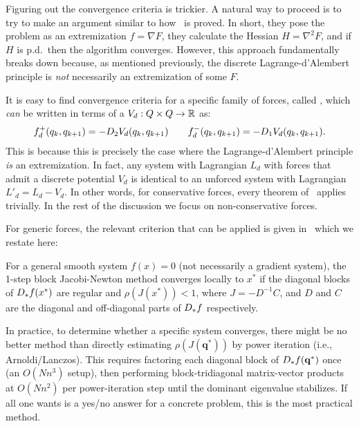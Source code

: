 Figuring out the convergence criteria is trickier. A natural way to proceed is to try to make an argument similar to how~\cite[Prop. 4.5]{ferraroParallelIterativeMethod2025} is proved. In short, they pose the problem as an extremization $f = \nabla F$, they calculate the Hessian $H = \nabla^2 F$, and if $H$ is p.d.\ then the algorithm converges. However, this approach fundamentally breaks down because, as mentioned previously, the discrete Lagrange-d'Alembert principle is \emph{not} necessarily an extremization of some $F$.

\begin{remark}
	It is easy to find convergence criteria for a specific family of forces, called , which \emph{can} be written in terms of a  $V_d : Q \times Q \to {\mathbb{R}}$ as:
	\[
		f_d^+(q_k, q_{k+1}) = -D_{2} V_d (q_k, q_{k+1})
		\qquad
		f_d^-(q_k, q_{k+1}) = -D_{1} V_d(q_k, q_{k+1}).
	\]
	This is because this is precisely the case where the Lagrange-d'Alembert principle \emph{is} an extremization. In fact, any system with Lagrangian $L_d$ with forces that admit a discrete potential $V_d$ is identical to an unforced system with Lagrangian $L'_d = L_d - V_d$. In other words, for conservative forces, every theorem of~\cite{ferraroParallelIterativeMethod2025} applies trivially. In the rest of the discussion we focus on non-conservative forces.
\end{remark}

For generic forces, the relevant criterion that can be applied is given in~\cite[Lem.~4.4]{ferraroParallelIterativeMethod2025} which we restate here:

\begin{lemma}\label{lem:jacobi-newton-convergence}
	For a general smooth system $f(x) = 0$ (not necessarily a gradient system), the 1-step block Jacobi-Newton method converges locally to $x^*$ if the diagonal blocks of $D_{*} f(x^*)$ are regular and $\rho(J(x^*)) < 1$, where $J = -D^{-1}C$, and $D$ and $C$ are the diagonal and off-diagonal parts of $D_{*} f$ respectively.
\end{lemma}

In practice, to determine whether a specific system converges, there might be no better method than directly estimating $\rho(J(\mathbf{q}^*))$ by power iteration (i.e., Arnoldi/Lanczos). This requires factoring each diagonal block of $D_{*} f(\mathbf{q}^*)$ once (an $O(N n^3)$ setup), then performing block-tridiagonal matrix-vector products at $O(N n^2)$ per power-iteration step until the dominant eigenvalue stabilizes. If all one wants is a yes/no answer for a concrete problem, this is the most practical method.


